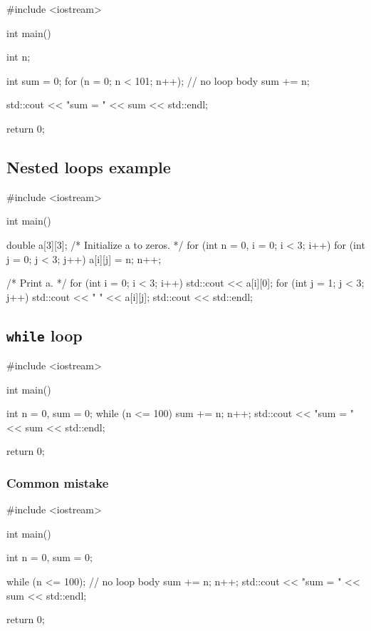 \documentclass[12pt,letterpaper,twoside]{article}
\begin{document}
\begin{cpp}
#include <iostream>

int main() {
  int n;

  int sum = 0;
  for (n = 0; n < 101; n++); // no loop body
  {
    sum += n;
  }

  std::cout << "sum = " << sum << std::endl;

  return 0;
}
\end{cpp}

\subsection{Nested loops example}
\begin{cpp}

#include <iostream>

int main() {
  double a[3][3];
  /* Initialize a to zeros. */
  for (int n = 0, i = 0; i < 3; i++) {
    for (int j = 0; j < 3; j++) {
      a[i][j] = n;
      n++;
    }
  }

  /* Print a. */
  for (int i = 0; i < 3; i++) {
    std::cout << a[i][0];
    for (int j = 1; j < 3; j++)
      std::cout << " " << a[i][j];
    std::cout << std::endl;
  }
}
\end{cpp}

\subsection{\texorpdfstring{\texttt{while} loop}{while loop}}
\begin{cpp}

#include <iostream>

int main() {
  int n = 0, sum = 0;
  while (n <= 100) {
    sum += n;
    n++;
  }
  std::cout << "sum = " << sum << std::endl;

  return 0;
}
\end{cpp}

\subsubsection{Common mistake}
\begin{cpp}
#include <iostream>

int main() {
  int n = 0, sum = 0;

  while (n <= 100); // no loop body
  {
    sum += n;
    n++;
  }
  std::cout << "sum = " << sum << std::endl;

  return 0;
}
\end{cpp}
\end{document}
